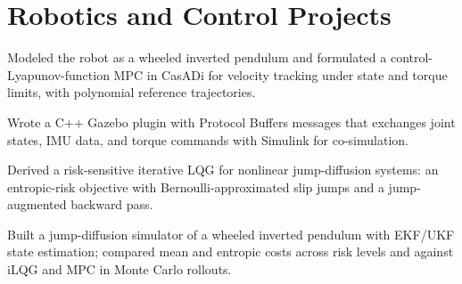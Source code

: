 \section{Robotics and Control Projects}
\cvItemsStart
\item Modeled the robot as a wheeled inverted pendulum and formulated a control-Lyapunov-function MPC in CasADi for velocity tracking under state and torque limits, with polynomial reference trajectories.
\item Wrote a C++ Gazebo plugin with Protocol Buffers messages that exchanges joint states, IMU data, and torque commands with Simulink for co-simulation.
\cvItemsEnd
{}
\cvItemsStart
\item Derived a risk-sensitive iterative LQG for nonlinear jump-diffusion systems: an entropic-risk objective with Bernoulli-approximated slip jumps and a jump-augmented backward pass.
\item Built a jump-diffusion simulator of a wheeled inverted pendulum with EKF/UKF state estimation; compared mean and entropic costs across risk levels and against iLQG and MPC in Monte Carlo rollouts.
\cvItemsEnd

